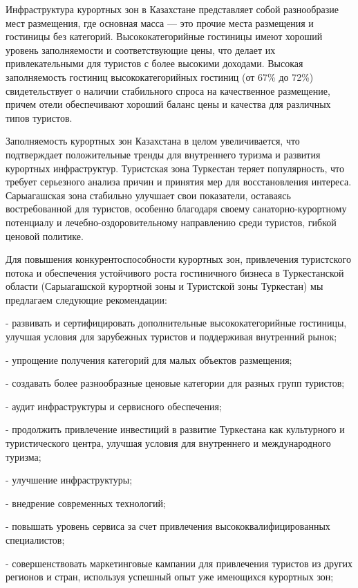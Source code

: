 \begin{multicols}{2}
Инфраструктура курортных зон в Казахстане представляет собой
разнообразие мест размещения, где основная масса --- это прочие места
размещения и гостиницы без категорий. Высококатегорийные гостиницы имеют
хороший уровень заполняемости и соответствующие цены, что делает их
привлекательными для туристов с более высокими доходами. Высокая
заполняемость гостиниц высококатегорийных гостиниц (от 67\% до 72\%)
свидетельствует о наличии стабильного спроса на качественное размещение,
причем отели обеспечивают хороший баланс цены и качества для различных
типов туристов.

Заполняемость курортных зон Казахстана в целом увеличивается, что
подтверждает положительные тренды для внутреннего туризма и развития
курортных инфраструктур. Туристская зона Туркестан теряет популярность,
что требует серьезного анализа причин и принятия мер для восстановления
интереса. Сарыагашская зона стабильно улучшает свои показатели,
оставаясь востребованной для туристов, особенно благодаря своему
санаторно-курортному потенциалу и лечебно-оздоровительному направлению
среди туристов, гибкой ценовой политике.

Для повышения конкурентоспособности курортных зон, привлечения
туристского потока и обеспечения устойчивого роста гостиничного бизнеса
в Туркестанской области (Сарыагашской курортной зоны и Туристской зоны
Туркестан) мы предлагаем следующие рекомендации:

- развивать и сертифицировать дополнительные высококатегорийные
гостиницы, улучшая условия для зарубежных туристов и поддерживая
внутренний рынок;

- упрощение получения категорий для малых объектов размещения;

- создавать более разнообразные ценовые категории для разных групп
туристов;

- аудит инфраструктуры и сервисного обеспечения;

- продолжить привлечение инвестиций в развитие Туркестана как
культурного и туристического центра, улучшая условия для внутреннего и
международного туризма;

- улучшение инфраструктуры;

- внедрение современных технологий;

- повышать уровень сервиса за счет привлечения высококвалифицированных
специалистов;

- совершенствовать маркетинговые кампании для привлечения туристов из
других регионов и стран, используя успешный опыт уже имеющихся курортных
зон;


\end{multicols}
